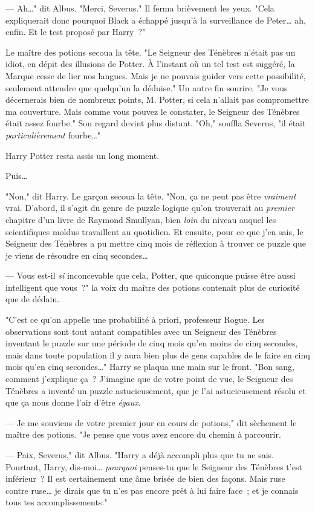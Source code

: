 --- Ah…" dit Albus. "Merci, Severus." Il ferma brièvement les yeux. "Cela expliquerait donc pourquoi Black a échappé jusqu'à la surveillance de Peter… ah, enfin. Et le test proposé par Harry~?"

Le maître des potions secoua la tête. "Le Seigneur des Ténèbres n'était pas un idiot, en dépit des illusions de Potter. À l'instant où un tel test est suggéré, la Marque cesse de lier nos langues. Mais je ne pouvais guider vers cette possibilité, seulement attendre que quelqu'un la déduise." Un autre fin sourire. "Je vous décernerais bien de nombreux points, M. Potter, si cela n'allait pas compromettre ma couverture. Mais comme vous pouvez le constater, le Seigneur des Ténèbres était assez fourbe." Son regard devint plus distant. "Oh," souffla Severus, "il était \emph{particulièrement} fourbe…"

Harry Potter resta assis un long moment.

Puis…

"Non," dit Harry. Le garçon secoua la tête. "Non, ça ne peut pas être \emph{vraiment} vrai. D'abord, il s'agit du genre de puzzle logique qu'on trouverait au \emph{premier} chapitre d'un livre de Raymond Smullyan, bien \emph{loin} du niveau auquel les scientifiques moldus travaillent au quotidien. Et ensuite, pour ce que j'en sais, le Seigneur des Ténèbres a pu mettre cinq mois de réflexion à trouver ce puzzle que je viens de résoudre en cinq secondes…

--- Vous est-il \emph{si} inconcevable que cela, Potter, que quiconque puisse être aussi intelligent que vous~?" la voix du maître des potions contenait plus de curiosité que de dédain.

"C'est ce qu'on appelle une probabilité à priori, professeur Rogue. Les observations sont tout autant compatibles avec un Seigneur des Ténèbres inventant le puzzle sur une période de cinq mois qu'en moins de cinq secondes, mais dans toute population il y aura bien plus de gens capables de le faire en cinq mois qu'en cinq secondes…" Harry se plaqua une main sur le front. "Bon sang, comment j'explique ça~? J'imagine que de votre point de vue, le Seigneur des Ténèbres a inventé un puzzle astucieusement, que je l'ai astucieusement résolu et que ça nous donne l'air d'être \emph{égaux}.

--- Je me souviens de votre premier jour en cours de potions," dit sèchement le maître des potions. "Je pense que vous avez encore du chemin à parcourir.

--- Paix, Severus," dit Albus. "Harry a déjà accompli plus que tu ne sais. Pourtant, Harry, dis-moi… \emph{pourquoi} penses-tu que le Seigneur des Ténèbres t'est inférieur~? Il est certainement une âme brisée de bien des façons. Mais ruse contre ruse… je dirais que tu n'es pas encore prêt à lui faire face~; et je connais tous tes accomplissements."

